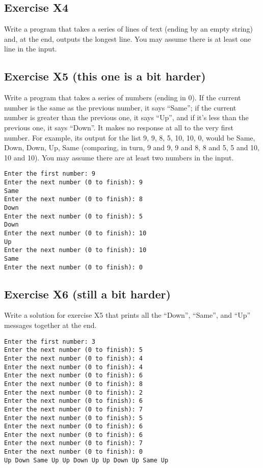 \subsection*{Exercise X4}

Write a program that takes a series of lines of text (ending by 
an empty string) and,
at the end, outputs the longest line.
You may assume there is at least one line in the input.

\pagebreak


\subsection*{Exercise X5 (this one is a bit harder)}

Write a program that takes
a series of numbers (ending in 0).  If the
current number is the same as the previous number, it says ``Same'';
if the current number is greater than the previous one, it says ``Up'',
and if it's less than the previous one, it says ``Down''.
It makes no response at all to the
very first number.  For example, its output for the list 9, 9, 8, 5,
10, 10, 0,
would be Same, Down, Down, Up, Same
(comparing, in turn, 9 and 9, 9 and 8, 8 and 5, 5 and 10, 10 and 10).
You may assume there are at least two numbers in the input.

\begin{verbatim}
Enter the first number: 9
Enter the next number (0 to finish): 9
Same
Enter the next number (0 to finish): 8
Down
Enter the next number (0 to finish): 5
Down
Enter the next number (0 to finish): 10
Up
Enter the next number (0 to finish): 10
Same
Enter the next number (0 to finish): 0
\end{verbatim}

\subsection*{Exercise X6 (still a bit harder)}

Write a solution for exercise X5 that prints all the ``Down'',
``Same'', and ``Up'' messages together at the end. 

\begin{verbatim}
Enter the first number: 3
Enter the next number (0 to finish): 5
Enter the next number (0 to finish): 4
Enter the next number (0 to finish): 4
Enter the next number (0 to finish): 6
Enter the next number (0 to finish): 8
Enter the next number (0 to finish): 2
Enter the next number (0 to finish): 6
Enter the next number (0 to finish): 7
Enter the next number (0 to finish): 5
Enter the next number (0 to finish): 6
Enter the next number (0 to finish): 6
Enter the next number (0 to finish): 7
Enter the next number (0 to finish): 0
Up Down Same Up Up Down Up Up Down Up Same Up 
\end{verbatim}


